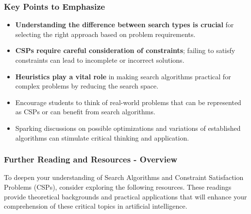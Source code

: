 \documentclass[aspectratio=169]{beamer}
\begin{document}
\begin{frame}[fragile]
    \frametitle{Key Points to Emphasize}
    \begin{itemize}
        \item \textbf{Understanding the difference between search types is crucial} for selecting the right approach based on problem requirements.
        \item \textbf{CSPs require careful consideration of constraints}; failing to satisfy constraints can lead to incomplete or incorrect solutions.
        \item \textbf{Heuristics play a vital role} in making search algorithms practical for complex problems by reducing the search space.
        \item Encourage students to think of real-world problems that can be represented as CSPs or can benefit from search algorithms.
        \item Sparking discussions on possible optimizations and variations of established algorithms can stimulate critical thinking and application.
    \end{itemize}
\end{frame}

\begin{frame}[fragile]
    \frametitle{Further Reading and Resources - Overview}
    To deepen your understanding of Search Algorithms and Constraint Satisfaction Problems (CSPs), consider exploring the following resources. 
    These readings provide theoretical backgrounds and practical applications that will enhance your comprehension of these critical topics in artificial intelligence.
\end{frame}
\end{document}
